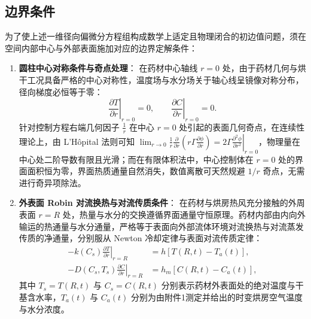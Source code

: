 \documentclass[12pt,a4paper]{ctexart}
\begin{document}
\subsection{边界条件}
为了使上述一维径向偏微分方程组构成数学上适定且物理闭合的初边值问题，须在空间内部中心与外部表面施加对应的边界定解条件：
\begin{enumerate}[label=(\arabic*)]
  \item \textbf{圆柱中心对称条件与奇点处理}：
  在药材中心轴线 $r=0$ 处，由于药材几何与烘干工况具备严格的中心对称性，温度场与水分场关于轴心线呈镜像对称分布，径向梯度必恒等于零：
  \begin{equation}
  \left.\frac{\partial T}{\partial r}\right|_{r=0} = 0,\qquad \left.\frac{\partial C}{\partial r}\right|_{r=0} = 0.\label{eq:centerbc}
  \end{equation}
  针对控制方程右端几何因子 $\frac{1}{r}$ 在中心 $r=0$ 处引起的表面几何奇点，在连续性理论上，由 L'Hôpital 法则可知 $\lim_{r\to 0}\frac{1}{r}\frac{\partial}{\partial r}\left(r\Gamma\frac{\partial\phi}{\partial r}\right) = 2\Gamma\left.\frac{\partial^2\phi}{\partial r^2}\right|_{r=0}$，物理量在中心处二阶导数有限且光滑；而在有限体积法中，中心控制体在 $r=0$ 处的界面面积恒为零，界面热质通量自然消失，数值离散可天然规避 $1/r$ 奇点，无需进行奇异项除法。

  \item \textbf{外表面 Robin 对流换热与对流传质条件}：
  在药材与烘房热风充分接触的外周表面 $r=R$ 处，热量与水分的交换遵循界面通量守恒原理。药材内部由内向外输运的热通量与水分通量，严格等于表面向外部流体环境对流换热与对流蒸发传质的净通量，分别服从 Newton 冷却定律与表面对流传质定律：
  \begin{align}
  -k(C_s)\left.\frac{\partial T}{\partial r}\right|_{r=R} &= h\left[T(R,t)-T_a(t)\right],\label{eq:robin_t}\\[8pt]
  -D(C_s,T_s)\left.\frac{\partial C}{\partial r}\right|_{r=R} &= h_m\left[C(R,t)-C_a(t)\right],\label{eq:robin_m}
  \end{align}
  其中 $T_s = T(R,t)$ 与 $C_s = C(R,t)$ 分别表示药材外表面处的绝对温度与干基含水率，$T_a(t)$ 与 $C_a(t)$ 分别为由附件1测定并给出的时变烘房空气温度与水分浓度。
\end{enumerate}
\end{document}
